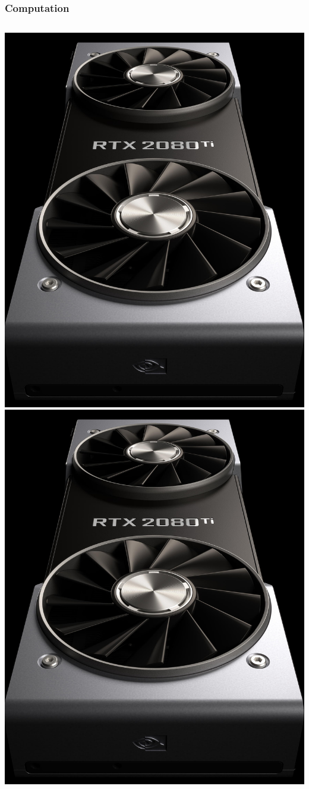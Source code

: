 \documentclass[\beamerclass,aspectratio=1610]{beamer}
\begin{document}
\begin{frame}
	\frametitle{Computation}
\begin{columns}


\centering
\includegraphics[width=0.8\columnwidth]{2080.jpg}\\
\includegraphics[width=0.8\columnwidth]{2080.jpg}\\

\end{columns}
\end{frame}
\end{document}
